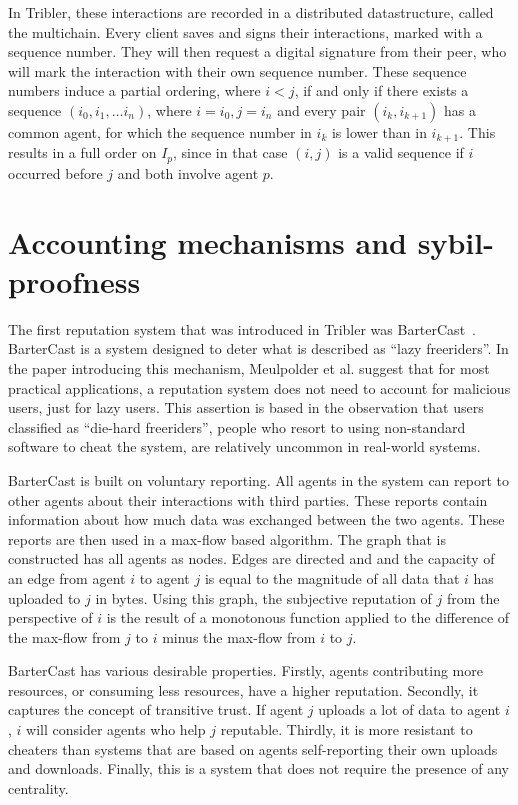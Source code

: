\documentclass[a4paper,11pt]{book}
\theoremstyle{definition}
\begin{document}
In Tribler, these interactions are recorded in a distributed datastructure, called the multichain.
Every client saves and signs their interactions, marked with a sequence number. They will then request
a digital signature from their peer, who will mark the interaction with their own sequence number.
These sequence numbers induce a partial ordering, where $i < j$, if and only if there exists
a sequence $(i_0, i_1, \ldots i_n)$, where $i=i_0, j=i_n$ and every pair $(i_k, i_{k+1})$ has
a common agent, for which the sequence number in $i_k$ is lower than in $i_{k+1}$.
This results in a full order on $I_p$, since in that case $(i, j)$ is a valid sequence if
$i$ occurred before $j$ and both involve agent $p$.



\chapter{Accounting mechanisms and sybil-proofness}
\label{chap:netflow}

The first reputation system that was introduced in Tribler was BarterCast~\cite{meulpolder2009bartercast}.
BarterCast is a system designed to deter what is described as ``lazy freeriders''.
In the paper introducing this mechanism, Meulpolder et al. suggest that for most practical applications, 
a reputation system does not
need to account for malicious users, just for lazy users. This assertion is based in the observation
that users classified as ``die-hard freeriders'', people who resort to using non-standard software to
cheat the system, are relatively uncommon in real-world systems. 

BarterCast is built on voluntary reporting. All agents in the system can report to other agents
about their interactions with third parties. These reports contain information about how much data
was exchanged between the two agents. These reports are then used in a max-flow based algorithm.
The graph that is constructed has all agents as nodes. Edges are directed and and the capacity
of an edge from agent $i$ to agent $j$ is equal to the magnitude of all data that $i$ has
uploaded to $j$ in bytes. Using this graph, the subjective reputation of $j$ from the perspective
of $i$ is the result of a monotonous function applied to the difference of the max-flow from $j$ to $i$
minus the max-flow from $i$ to $j$.

BarterCast has various desirable properties. Firstly, agents contributing more resources, or consuming
less resources, have a higher reputation. Secondly, it captures the concept of transitive trust. If agent
$j$ uploads a lot of data to agent $i$, $i$ will consider agents who help $j$ reputable. Thirdly,
it is more resistant to cheaters than systems that are based on agents self-reporting their own uploads and
downloads. Finally, this is a system that does not require the presence of any centrality. 
\end{document}
